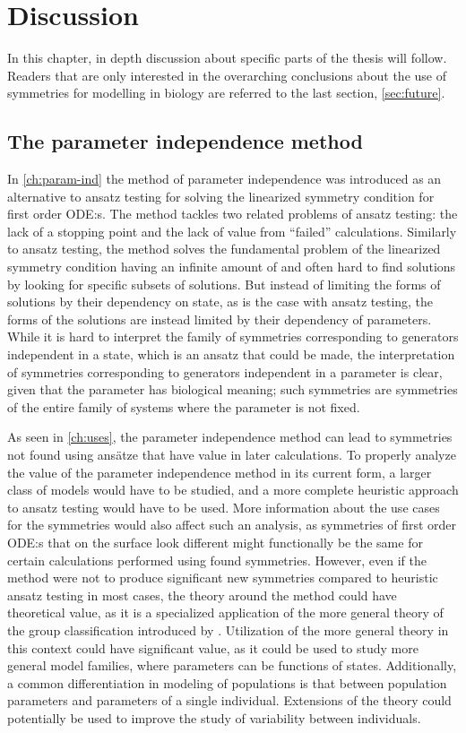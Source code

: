 \chapter{Discussion}

In this chapter, in depth discussion about specific parts of the thesis will follow.
Readers that are only interested in the overarching conclusions about the use of symmetries for modelling in biology are referred to the last section, \cref{sec:future}.

\section{The parameter independence method}

In \cref{ch:param-ind} the method of parameter independence was introduced as an alternative to ansatz testing for solving the linearized symmetry condition for first order ODE:s.
The method tackles two related problems of ansatz testing: the lack of a stopping point and the lack of value from \enquote{failed} calculations.
Similarly to ansatz testing, the method solves the fundamental problem of the linearized symmetry condition having an infinite amount of and often hard to find solutions by looking for specific subsets of solutions.
But instead of limiting the forms of solutions by their dependency on state, as is the case with ansatz testing, the forms of the solutions are instead limited by their dependency of parameters.
While it is hard to interpret the family of symmetries corresponding to generators independent in a state, which is an ansatz that could be made, the interpretation of symmetries corresponding to generators independent in a parameter is clear, given that the parameter has biological meaning; such symmetries are symmetries of the entire family of systems where the parameter is not fixed.

As seen in \cref{ch:uses}, the parameter independence method can lead to symmetries not found using ansätze that have value in later calculations.
To properly analyze the value of the parameter independence method in its current form, a larger class of models would have to be studied, and a more complete heuristic approach to ansatz testing would have to be used.
More information about the use cases for the symmetries would also affect such an analysis, as symmetries of first order ODE:s that on the surface look different might functionally be the same for certain calculations performed using found symmetries.
However, even if the method were not to produce significant new symmetries compared to heuristic ansatz testing in most cases, the theory around the method could have theoretical value, as it is a specialized application of the more general theory of the group classification introduced by \citeauthor{ovsiannikov1982group} \cite{ovsiannikov1982group}.
Utilization of the more general theory in this context could have significant value, as it could be used to study more general model families, where parameters can be functions of states.
Additionally, a common differentiation in modeling of populations is that between population parameters and parameters of a single individual.
Extensions of the theory could potentially be used to improve the study of variability between individuals.

